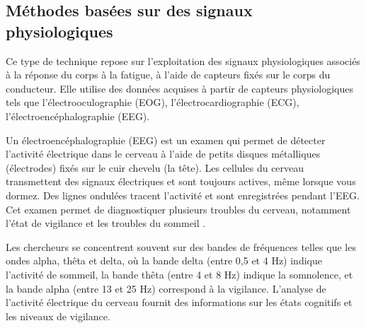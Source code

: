 \subsection{Méthodes basées sur des signaux physiologiques}
Ce type de technique repose sur l'exploitation des signaux physiologiques associés à la réponse du corps à la fatigue, à l'aide de capteurs fixés sur le corps du conducteur. Elle utilise des données acquises à partir de capteurs physiologiques tels que l'électrooculographie (EOG), l'électrocardiographie (ECG), l'électroencéphalographie (EEG).

Un électroencéphalographie (EEG) est un examen qui permet de détecter l’activité électrique dans le cerveau à l’aide de petits disques métalliques (électrodes) fixés sur le cuir chevelu (la tête). Les cellules du cerveau transmettent des signaux électriques et sont toujours actives, même lorsque vous dormez. Des lignes ondulées tracent l’activité et sont enregistrées pendant l’EEG. Cet examen permet de diagnostiquer plusieurs troubles du cerveau, notamment l'état de vigilance et les troubles du sommeil\cite{EEG} .

Les chercheurs se concentrent souvent sur des bandes de fréquences telles que les ondes alpha, thêta et delta, où la bande delta (entre 0,5 et 4 Hz) indique l'activité de sommeil, la bande thêta (entre 4 et 8 Hz) indique la somnolence, et la bande alpha (entre 13 et 25 Hz) correspond à la vigilance. L'analyse de l'activité électrique du cerveau fournit des informations sur les états cognitifs et les niveaux de vigilance\cite{sahayadhas2012detecting}.
 
